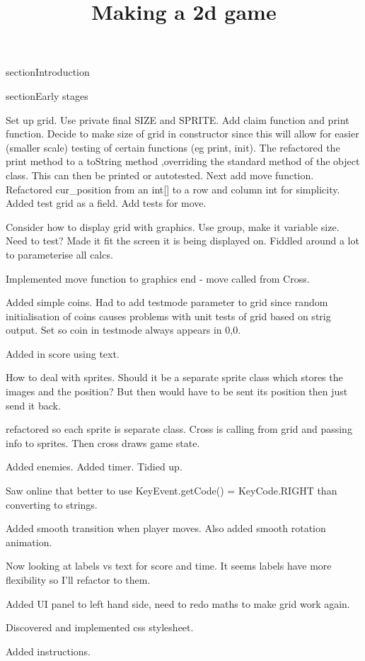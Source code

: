 \documentclass{article}
\begin{document}
\title{Making a 2d game}
\maketitle

section{Introduction}

section{Early stages}

Set up grid. Use private final SIZE and SPRITE. Add claim function and print function. Decide to make size of grid
in constructor since this will allow for easier (smaller scale) testing of certain functions (eg print, init).
The refactored the print method to a toString method ,overriding the standard method of the object class. This
can then be printed or autotested. Next add move function. Refactored cur_position from an int[] to a row and
column int for simplicity. Added test grid as a field. Add tests for move.

Consider how to display grid with graphics. Use group, make it variable size. Need to test? Made it fit the screen
it is being displayed on. Fiddled around a lot to parameterise all calcs.

Implemented move function to graphics end - move called from Cross.

Added simple coins. Had to add testmode parameter to grid since random initialisation of coins causes problems with
unit tests of grid based on strig output. Set so coin in testmode always appears in 0,0.

Added in score using text.

How to deal with sprites. Should it be a separate sprite class which stores the images and the position? But then
would have to be sent its position then just send it back.

refactored so each sprite is separate class. Cross is calling from grid and passing info to sprites. Then cross draws
game state.

Added enemies. Added timer. Tidied up.

Saw online that better to use KeyEvent.getCode() = KeyCode.RIGHT than converting to strings.

Added smooth transition when player moves. Also added smooth rotation animation.

Now looking at labels vs text for score and time. It seems labels have more flexibility so I'll refactor to them.

Added UI panel to left hand side, need to redo maths to make grid work again.

Discovered and implemented css stylesheet.

Added instructions.
\end{document}
